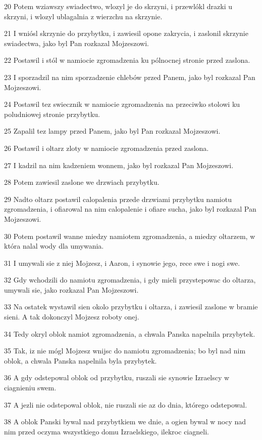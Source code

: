 \par 20 Potem wziawszy swiadectwo, wlozyl je do skrzyni, i przewlókl drazki u skrzyni, i wlozyl ublagalnia z wierzchu na skrzynie.
\par 21 I wniósl skrzynie do przybytku, i zawiesil opone zakrycia, i zaslonil skrzynie swiadectwa, jako byl Pan rozkazal Mojzeszowi.
\par 22 Postawil i stól w namiocie zgromadzenia ku pólnocnej stronie przed zaslona.
\par 23 I sporzadzil na nim sporzadzenie chlebów przed Panem, jako byl rozkazal Pan Mojzeszowi.
\par 24 Postawil tez swiecznik w namiocie zgromadzenia na przeciwko stolowi ku poludniowej stronie przybytku.
\par 25 Zapalil tez lampy przed Panem, jako byl Pan rozkazal Mojzeszowi.
\par 26 Postawil i oltarz zloty w namiocie zgromadzenia przed zaslona.
\par 27 I kadzil na nim kadzeniem wonnem, jako byl rozkazal Pan Mojzeszowi.
\par 28 Potem zawiesil zaslone we drzwiach przybytku.
\par 29 Nadto oltarz postawil calopalenia przede drzwiami przybytku namiotu zgromadzenia, i ofiarowal na nim calopalenie i ofiare sucha, jako byl rozkazal Pan Mojzeszowi.
\par 30 Potem postawil wanne miedzy namiotem zgromadzenia, a miedzy oltarzem, w która nalal wody dla umywania.
\par 31 I umywali sie z niej Mojzesz, i Aaron, i synowie jego, rece swe i nogi swe.
\par 32 Gdy wchodzili do namiotu zgromadzenia, i gdy mieli przystepowac do oltarza, umywali sie, jako rozkazal Pan Mojzeszowi.
\par 33 Na ostatek wystawil sien okolo przybytku i oltarza, i zawiesil zaslone w bramie sieni. A tak dokonczyl Mojzesz roboty onej.
\par 34 Tedy okryl oblok namiot zgromadzenia, a chwala Panska napelnila przybytek.
\par 35 Tak, iz nie mógl Mojzesz wnijsc do namiotu zgromadzenia; bo byl nad nim oblok, a chwala Panska napelnila byla przybytek.
\par 36 A gdy odstepowal oblok od przybytku, ruszali sie synowie Izraelscy w ciagnieniu swem.
\par 37 A jezli nie odstepowal oblok, nie ruszali sie az do dnia, którego odstepowal.
\par 38 A oblok Panski bywal nad przybytkiem we dnie, a ogien bywal w nocy nad nim przed oczyma wszystkiego domu Izraelskiego, ilekroc ciagneli.


